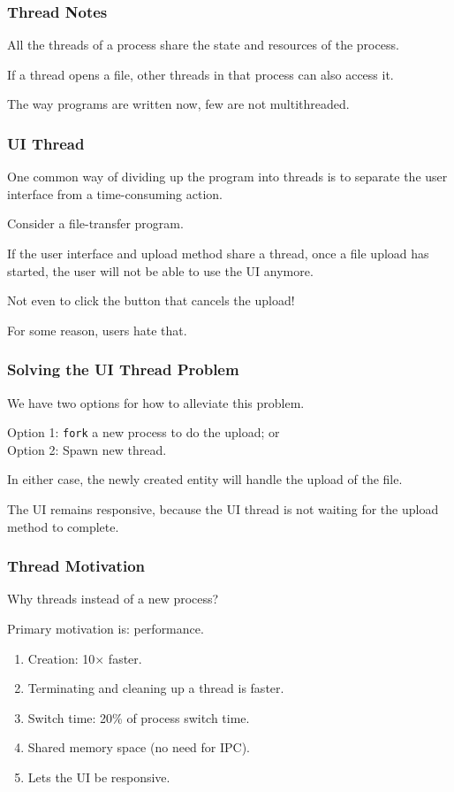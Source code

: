 \begin{frame}
	\frametitle{Thread Notes}

	All the threads of a process share the state and resources of the process.

	If a thread opens a file, other threads in that process can also access it.

	The way programs are written now, few are not multithreaded.



\end{frame}

\begin{frame}
	\frametitle{UI Thread}

	One common way of dividing up the program into threads is to separate the user interface from a time-consuming action.

	Consider a file-transfer program.

	If the user interface and upload method share a thread, once a file upload has started, the user will not be able to use the UI anymore.

	Not even to click the button that cancels the upload!

	For some reason, users hate that.

\end{frame}

\begin{frame}
	\frametitle{Solving the UI Thread Problem}

	We have two options for how to alleviate this problem.

	Option 1: \texttt{fork} a new process to do the upload; or \\
	Option 2: Spawn  new thread.

	In either case, the newly created entity will handle the upload of the file.

	The UI remains responsive, because the UI thread is not waiting for the upload method to complete.

\end{frame}

\begin{frame}
	\frametitle{Thread Motivation}
	Why threads instead of a new process?

	Primary motivation is: performance.

	\begin{enumerate}
		\item Creation: 10$\times$ faster.
		\item Terminating and cleaning up a thread is faster.
		\item Switch time: 20\% of process switch time.
		\item Shared memory space (no need for IPC).
		\item Lets the UI be responsive.
	\end{enumerate}

\end{frame}

